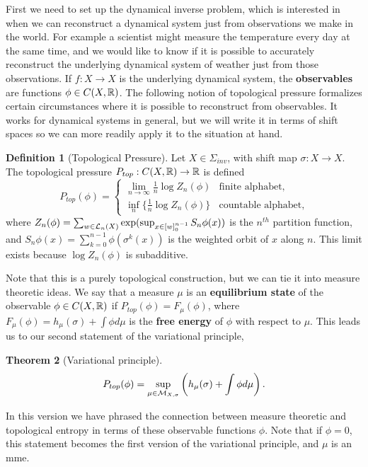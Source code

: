 \documentclass[11pt, reqno]{amsart}
\theoremstyle{plain}
\newtheorem{thm}{Theorem}[section]
\numberwithin{thm}{subsection}
\theoremstyle{definition}
\newtheorem{defn}[thm]{Definition}
\begin{document}
First we need to set up the dynamical inverse problem, which is interested in when we can reconstruct a dynamical system just from observations we make in the world. For example a scientist might measure the temperature every day at the same time, and we would like to know if it is possible to accurately reconstruct the underlying dynamical system of weather just from those observations. If $f: X \rightarrow X$ is the underlying dynamical system, the \textbf{observables} are functions $\phi \in C(X,\mathbb{R})$. The following notion of topological pressure formalizes certain circumstances where it is possible to reconstruct from observables. It works for dynamical systems in general, but we will write it in terms of shift spaces so we can more readily apply it to the situation at hand.
\begin{defn}[Topological Pressure]
  Let $X \in \Sigma_{inv}$, with shift map $\sigma: X \rightarrow X$. The topological pressure $P_{top}: C(X,\mathbb{R}) \rightarrow \mathbb{R}$ is defined 
  $$P_{top}(\phi) = \begin{cases}
    \lim_{n\rightarrow \infty}\frac{1}{n}\log Z_n(\phi) & \text{finite alphabet,} \\ 
    \inf_n \{\frac{1}{n}\log Z_n(\phi)\}
    & \text{countable alphabet,}
  \end{cases}$$
  where $Z_n(\phi) = \sum_{w \in \mathcal{L}_n(X)}\exp(\sup_{x \in [w]_0^{n-1}} S_n\phi(x))$ is the $n^{th}$ partition function, and 
  $S_n\phi(x) = \sum_{k=0}^{n-1}\phi(\sigma^k(x))$ is the weighted orbit of $x$ along $n$. This limit exists because  $\log Z_n(\phi)$ is subadditive.
\end{defn}

Note that this is a purely topological construction, but we can tie it into measure theoretic ideas. We say that a measure $\mu$ is an \textbf{equilibrium state} of the observable $\phi \in C(X, \mathbb{R})$ if $P_{top}(\phi) = F_\mu(\phi)$, where $F_\mu(\phi) = h_\mu(\sigma) + \int\phi d\mu$ is the \textbf{free energy} of $\phi$ with respect to $\mu$. This leads us to our second statement of the variational principle, 

\begin{thm}[Variational principle]
  $$P_{top}(\phi) = \sup_{\mu \in \mathcal{M}_{X,\sigma}}\left(h_\mu(\sigma)+\int \phi d\mu\right).$$
\end{thm}
In this version we have phrased the connection between measure theoretic and topological entropy in terms of these observable functions $\phi$. Note that if $\phi = 0$, this statement becomes the first version of the variational principle, and $\mu$ is an mme. 
\end{document}
